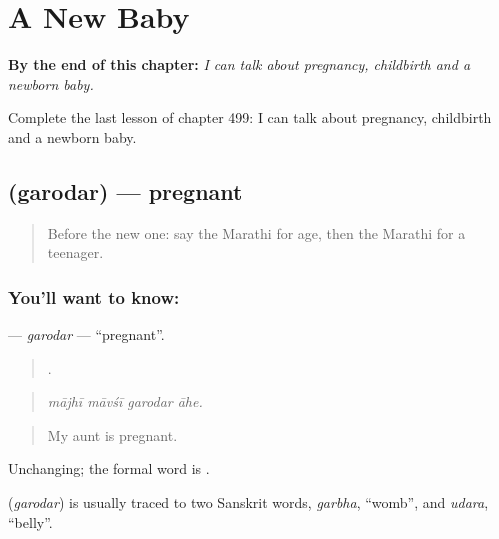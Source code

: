 
\chapter{A New Baby}
\label{ch:mr-a-new-baby}

\begin{chapteropening}
\textbf{By the end of this chapter:} \emph{I can talk about pregnancy, childbirth and a newborn baby.}

Complete the last lesson of chapter 499: I can talk about pregnancy, childbirth and a newborn baby.
\end{chapteropening}

\section[\texorpdfstring{\mr{गरोदर} (garodar)}{गरोदर (garodar)}]{ (garodar) — pregnant}

\label{lesson:MR-C499-garodar}



\begin{quote}
Before the new one: say the Marathi for age, then the Marathi for a teenager.
\end{quote}

\subsection*{You'll want to know: }
\textbf{} — \emph{garodar} — \textquotedblleft{}pregnant\textquotedblright{}.

\begin{quote}
   .
\end{quote}

\begin{quote}
\emph{mājhī māvśī garodar āhe.}
\end{quote}

\begin{quote}
My aunt is pregnant.
\end{quote}

Unchanging; the formal word is .

\begin{cousinweb}
\textbf{} (\emph{garodar}) is usually traced to two Sanskrit words, \emph{garbha}, \textquotedblleft{}womb\textquotedblright{}, and \emph{udara}, \textquotedblleft{}belly\textquotedblright{}.
\end{cousinweb}

